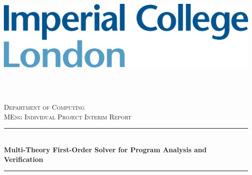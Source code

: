 \documentclass[12pt]{article}
\begin{document}
\begin{titlepage}

\newcommand{\HRule}{\rule{\linewidth}{0.5mm}}
\setlength{\topmargin}{0in}
\center
 
 
\begin{minipage}{0.4\textwidth}
\begin{flushleft} \large
\hspace*{-0.5cm}
\includegraphics[scale=0.14]{imperial.png}\\
\end{flushleft}
\end{minipage}
~
\begin{minipage}{0.5\textwidth}
\begin{flushright} \large
\hspace*{2cm}
\end{flushright}
\end{minipage}\\[1cm]


\textsc{\Large Department of Computing}\\[0.5cm]
\textsc{\large MEng Individual Project Interim Report}\\[0.5cm]


\HRule \\[0.4cm]
{ \huge \bfseries Multi-Theory First-Order Solver for Program Analysis and Verification}\\[0.4cm]
\HRule \\[1cm]
 


\end{titlepage}
\end{document}
